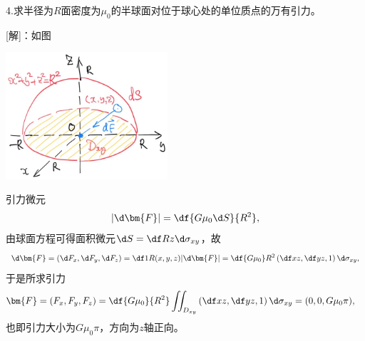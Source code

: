 \bs

4.求半径为$R$面密度为$\mu_0$的半球面对位于球心处的单位质点的万有引力。

[解]：如图
\begin{center}
	\includegraphics[width=0.45\textwidth]{./images/ch10/10.4.4.jpg}
\end{center}
引力微元
$$|\d \bm{F}|=\df{G\mu_0\d S}{R^2},$$
由球面方程可得面积微元$\d S=\df Rz\d\sigma_{xy}$，故
$$\d \bm{F}=(\d F_x,\d F_y,\d F_z)
=\df1R(x,y,z)|\d \bm{F}|=\df{G\mu_0}R^2\left(\df xz,\df yz, 1\right)
\d\sigma_{xy},$$
于是所求引力
\begin{align*}
	\bm{F}&=(F_x,F_y,F_z)
	=\df{G\mu_0}{R^2}\iint_{D_{xy}}\left(\df xz,\df yz, 1\right)\d\sigma_{xy}
	=(0,0,G\mu_0\pi),
\end{align*}
也即引力大小为$G\mu_0\pi$，方向为$z$轴正向。\fin